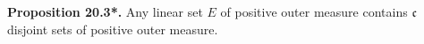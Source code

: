 \textbf{Proposition 20.3*.} Any linear set $E$ of positive outer measure contains $\mathfrak{c}$ disjoint sets of positive outer measure.
